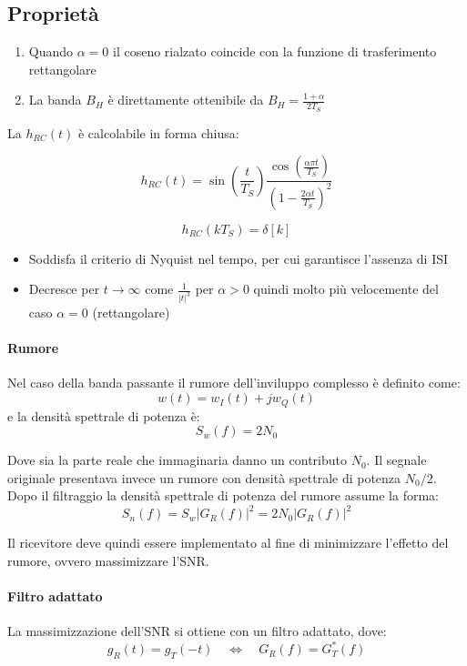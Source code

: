 \subsection*{Propriet\`a}
\begin{enumerate}
    \item Quando \( \alpha = 0 \) il coseno rialzato coincide con la funzione di trasferimento rettangolare
    \item La banda \( B_H \) \`e direttamente ottenibile da \( B_H = \frac{1+\alpha}{2T_S} \)
\end{enumerate}

La \( h_{RC}(t) \) \`e calcolabile in forma chiusa:

\[ h_{RC}(t) = \sin\left(\frac{t}{T_S}\right) \frac{\cos\left(\frac{\alpha \pi t}{T_S}\right)}{\left(1- \frac{2\alpha t}{T_S}\right)^2}  \]

\[ h_{RC}(kT_S) = \delta[k] \]

\begin{itemize}
    \item Soddisfa il criterio di Nyquist nel tempo, per cui garantisce l'assenza di ISI
    \item Decresce per \( t \rightarrow \infty \) come \( \frac{1}{|t|^3} \) per \( \alpha > 0 \) quindi molto pi\`u velocemente del caso \( \alpha = 0 \) (rettangolare)
\end{itemize}


\paragraph*{Rumore}
Nel caso della banda passante il rumore dell'inviluppo complesso è definito come:
\[
    w(t) = w_I(t) + jw_Q(t)
\]
e la densità spettrale di potenza è:
\[
    S_w(f) = 2N_0
\]


Dove sia la parte reale che immaginaria danno un contributo $N_0$. Il segnale originale presentava invece un rumore con densità spettrale di potenza $N_0/2$.
Dopo il filtraggio la densità spettrale di potenza del rumore assume la forma:
\[
    S_n(f) = S_w |G_R(f)|^2 = 2N_0 |G_R(f)|^2
\]

Il ricevitore deve quindi essere implementato al fine di minimizzare l'effetto del rumore, ovvero massimizzare l'SNR.

\paragraph*{Filtro adattato}
La massimizzazione dell'SNR si ottiene con un filtro adattato, dove:
\[
    g_R(t) = g_T(-t) \quad \Longleftrightarrow \quad G_R(f) = G_T^*(f)
\]

